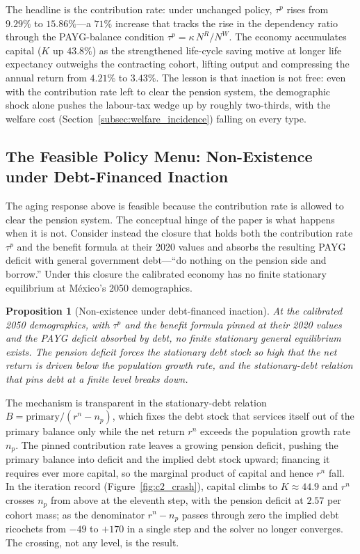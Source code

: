 \documentclass[12pt,a4paper]{article}
\newtheorem{proposition}{Proposition}
\begin{document}
The headline is the contribution rate: under unchanged policy, $\tau^p$ rises from $9.29\%$ to $15.86\%$---a $71\%$ increase that tracks the rise in the dependency ratio through the PAYG-balance condition $\tau^p=\kappa\,N^R/N^W$. The economy accumulates capital ($K$ up $43.8\%$) as the strengthened life-cycle saving motive at longer life expectancy outweighs the contracting cohort, lifting output and compressing the annual return from $4.21\%$ to $3.43\%$. The lesson is that inaction is not free: even with the contribution rate left to clear the pension system, the demographic shock alone pushes the labour-tax wedge up by roughly two-thirds, with the welfare cost (Section~\ref{subsec:welfare_incidence}) falling on every type.

\subsection{The Feasible Policy Menu: Non-Existence under Debt-Financed Inaction}
\label{subsec:c2_infeasibility}

The aging response above is feasible because the contribution rate is allowed to clear the pension system. The conceptual hinge of the paper is what happens when it is not. Consider instead the closure that holds both the contribution rate $\tau^p$ and the benefit formula at their 2020 values and absorbs the resulting PAYG deficit with general government debt---``do nothing on the pension side and borrow.'' Under this closure the calibrated economy has no finite stationary equilibrium at M\'exico's 2050 demographics.

\begin{proposition}[Non-existence under debt-financed inaction]
\label{prop:c2}
At the calibrated 2050 demographics, with $\tau^p$ and the benefit formula pinned at their 2020 values and the PAYG deficit absorbed by debt, no finite stationary general equilibrium exists. The pension deficit forces the stationary debt stock so high that the net return is driven below the population growth rate, and the stationary-debt relation that pins debt at a finite level breaks down.
\end{proposition}

The mechanism is transparent in the stationary-debt relation $B=\text{primary}/(r^n-n_p)$, which fixes the debt stock that services itself out of the primary balance only while the net return $r^n$ exceeds the population growth rate $n_p$. The pinned contribution rate leaves a growing pension deficit, pushing the primary balance into deficit and the implied debt stock upward; financing it requires ever more capital, so the marginal product of capital and hence $r^n$ fall. In the iteration record (Figure~\ref{fig:c2_crash}), capital climbs to $K\approx 44.9$ and $r^n$ crosses $n_p$ from above at the eleventh step, with the pension deficit at $2.57$ per cohort mass; as the denominator $r^n-n_p$ passes through zero the implied debt ricochets from $-49$ to $+170$ in a single step and the solver no longer converges. The crossing, not any level, is the result.
\end{document}

